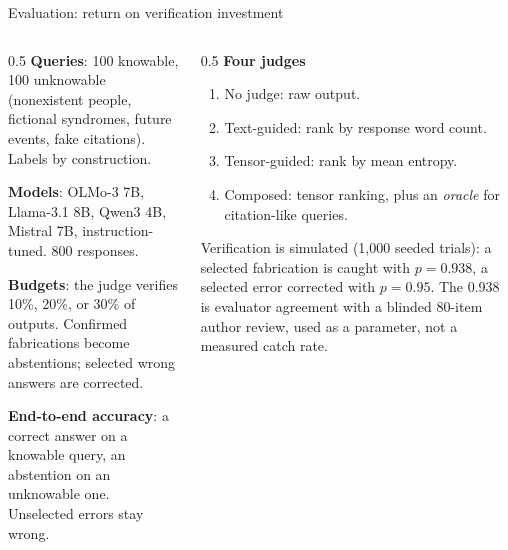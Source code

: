 \documentclass[aspectratio=169,10pt]{beamer}
\begin{document}
\begin{frame}{Evaluation: return on verification investment}
  \begin{columns}[T]
    \begin{column}{0.5\textwidth}
      \small
      \textbf{Queries}: 100 knowable, 100 unknowable (nonexistent people,
      fictional syndromes, future events, fake citations). Labels by construction.

      \vspace{0.3em}
      \textbf{Models}: OLMo-3 7B, Llama-3.1 8B, Qwen3 4B, Mistral 7B,
      instruction-tuned. 800 responses.

      \vspace{0.3em}
      \textbf{Budgets}: the judge verifies 10\%, 20\%, or 30\% of outputs.
      Confirmed fabrications become abstentions; selected wrong answers are
      corrected.

      \vspace{0.3em}
      \textbf{End-to-end accuracy}: a correct answer on a knowable query, an
      abstention on an unknowable one. Unselected errors stay wrong.
    \end{column}
    \begin{column}{0.5\textwidth}
      \textbf{Four judges}
      \begin{enumerate}
        \item No judge: raw output.
        \item \textcolor{textpink}{Text-guided}: rank by response word count.
        \item \textcolor{tensorblue}{Tensor-guided}: rank by mean entropy.
        \item Composed: tensor ranking, plus an \emph{oracle} for citation-like queries.
      \end{enumerate}
      \vspace{0.4em}
      \small
      Verification is simulated (1{,}000 seeded trials): a selected fabrication is
      caught with $p=0.938$, a selected error corrected with $p=0.95$. The 0.938
      is evaluator agreement with a blinded 80-item author review, used as a
      parameter, not a measured catch rate.
    \end{column}
  \end{columns}
\end{frame}
\end{document}
